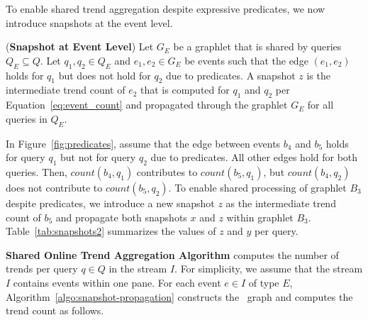 To enable shared trend aggregation despite expressive predicates, we now introduce snapshots at the event level.


\begin{definition}(\textbf{Snapshot at Event Level})
%
Let $G_E$ be a graphlet that is shared by queries $Q_E \subseteq Q$. Let $q_1,q_2 \in Q_E$ and $e_1, e_2 \in G_E$ be events such that the edge $(e_1,e_2)$ holds for $q_1$ but does not hold for $q_2$ due to predicates. 
A snapshot $z$ is the intermediate trend count of $e_2$ that is 
computed for $q_1$ and $q_2$ per Equation~\ref{eq:event_count} and propagated through the graphlet $G_E$ for all queries in $Q_E$.
%
\label{def:snapshot2}
\end{definition}
%



\begin{example}
In Figure~\ref{fig:predicates}, assume that the edge between events $b_4$ and $b_5$ holds for query $q_1$ but not for query $q_2$ due to predicates. All other edges hold for both queries. Then, $count(b_4,q_1)$ contributes to $count(b_5,q_1)$, but $count(b_4,q_2)$ does not contribute to $count(b_5,q_2)$. To enable shared processing of graphlet $B_3$ despite predicates, we introduce a new snapshot $z$ as the intermediate trend count of $b_5$ and propagate both snapshots $x$ and $z$ within graphlet $B_3$. 
Table~\ref{tab:snapshots2} summarizes the values of $z$ and $y$ per query. 
\end{example}

\textbf{Shared Online Trend Aggregation Algorithm} computes the number of trends per query $q \in Q$ in the stream $I$. For simplicity, we assume that the stream $I$ contains events within one pane.
%
For each event $e \in I$ of type $E$, Algorithm~\ref{algo:snapshot-propagation} constructs the \app\ graph and computes the trend count as follows. 


